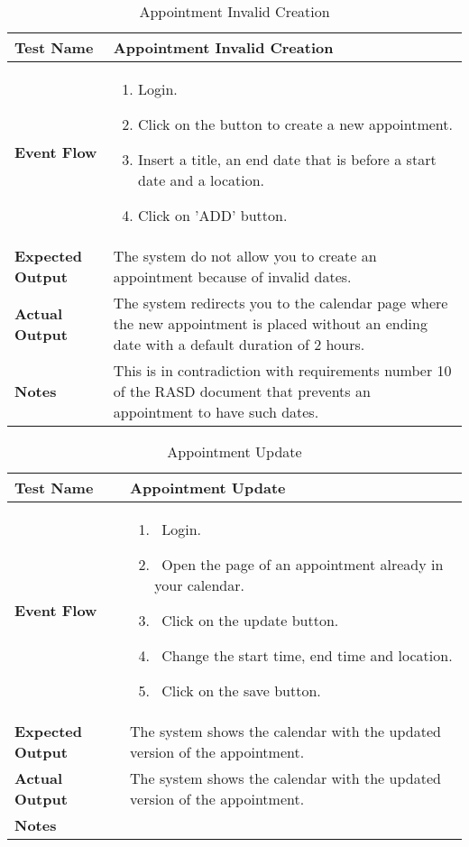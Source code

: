 \begin{table}[h]	
	\centering
	\def\arraystretch{1.5}
	\begin{tabular}{|m{7cm}|m{7cm}|}
		\hline
		\textbf{Test Name}            & Appointment Invalid Creation   \\ \hline
		\textbf{Event Flow}             & 
		\begin{enumerate}
			\item Login.
			\item Click on the button to create a new appointment.
			\item Insert a title, an end date that is before a start date and a location.
			\item Click on 'ADD' button.
		\end{enumerate} \\ \hline
		\textbf{Expected Output}  &  The system do not allow you to create an appointment because of invalid dates.   \\ \hline
		\textbf{Actual Output}       & The system redirects you to the calendar page where the new appointment is placed without an ending date with a default duration of 2 hours.    \\ \hline
		\textbf{Notes} & This is in contradiction with requirements number 10 of the RASD document that prevents an appointment to have such dates. \\ \hline
	\end{tabular}
	\caption{Appointment Invalid Creation}
\end{table}


\begin{table}[h]	
\centering
\def\arraystretch{1.5}
\begin{tabular}{|m{7cm}|m{7cm}|}
	\hline
	\textbf{Test Name}            &  Appointment Update  \\ \hline
	\textbf{Event Flow}             & 
		\begin{enumerate}
			\item~Login.
			\item~Open the page of an appointment already in your calendar.
			\item~Click on the update button.
			\item~Change the start time, end time and location.
			\item~Click on the save button.
		\end{enumerate}
	\\ \hline
	\textbf{Expected Output}  &  The system shows the calendar with the updated version of the appointment.   \\ \hline
	\textbf{Actual Output}       &  The system shows the calendar with the updated version of the appointment.   \\ \hline
	\textbf{Notes} & \\ \hline
\end{tabular}
\caption{Appointment Update}
\end{table}


